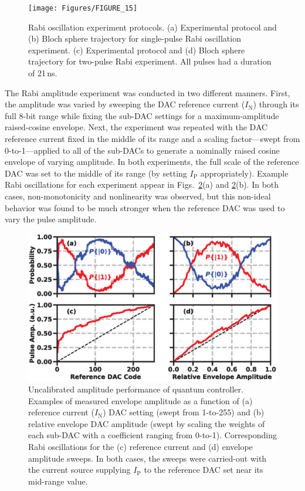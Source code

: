 \documentclass[journal]{IEEEtran}
\newcommand{\CR}[1]{{\color{black}#1}}
\begin{document}
\begin{figure}[bt!]
\texttt{[image: Figures/FIGURE\_15]}
\caption{\CR{Rabi oscillation experiment protocols. (a) Experimental protocol and (b) Bloch sphere trajectory for single-pulse Rabi oscillation experiment. (c) Experimental protocol and (d) Bloch sphere trajectory for two-pulse Rabi experiment. All pulses had a duration of 21\,ns.}}\label{rabisingle}
\end{figure}

\CR{The Rabi amplitude experiment was conducted in two different manners. First, the amplitude was varied by sweeping the DAC reference current ($I_\text{N}$) through its full 8-bit range while fixing the sub-DAC settings for a maximum-amplitude raised-cosine envelope. Next, the experiment was repeated with the DAC reference current fixed in the middle of its range and a scaling factor---swept from 0-to-1---applied to all of the sub-DACs to generate a nominally raised cosine envelope of varying amplitude.  In both experiments, the full scale of the reference DAC was set to the middle of its range (by setting $I_\text{P}$ appropriately). Example Rabi oscillations for each experiment appear in Figs.~\ref{cal}(a) and \ref{cal}(b). In both cases, non-monotonicity and nonlinearity was observed, but this non-ideal behavior was found to be  much stronger when the reference DAC was used to vary the pulse amplitude.}  
\begin{figure}[bt!]
\centering
\includegraphics[width=\columnwidth]{Figures/FIGURE_16}
\caption{\CR{Uncalibrated amplitude performance of quantum controller. Examples of measured envelope amplitude as a function of (a) reference current ($I_\text{N}$) DAC setting (swept from 1-to-255) and (b) relative envelope DAC amplitude (swept by scaling the weights of each sub-DAC with a coefficient ranging from 0-to-1). Corresponding Rabi oscillations for the (c) reference current and (d) envelope amplitude sweeps. In both cases, the sweeps were carried-out with the current source supplying $I_\text{P}$ to the reference DAC set near its mid-range value. }}\label{cal}
\end{figure}
\end{document}
